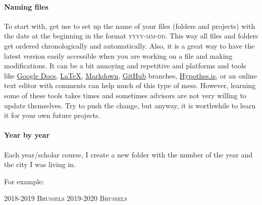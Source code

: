 \documentclass{article}
\begin{document}
\paragraph{Naming files}
\label{parag: naming}

To start with, get use to set up the name of your files (folders and projects) with the date at the beginning in the format \textsc{yyyy-mm-dd}. This way all files and folders get ordered chronologically and automatically. Also, it is a great way to have the latest version easily accessible when you are working on a file and making modifications. It can be a bit annoying and repetitive and platforms and tools like \href{https://www.google.com/docs/about/}{Google Docs}, \href{https://www.latex-project.org/}{\LaTeX}, \href{https://en.wikipedia.org/wiki/Markdown}{Markdown}, \href{https://github.com/}{GitHub} branches, \href{https://web.hypothes.is/}{Hypothes.is}, or an online text editor with comments can help much of this type of mess. However, learning some of these tools takes times and sometimes advisors are not very willing to update themselves. Try to push the change, but anyway, it is worthwhile to learn it for your own future projects. 

\paragraph{Year by year}
\label{parag: year}

Each year/scholar course, I create a new folder with the number of the year and the city I was living in. 

For example: 
\begin{center}
\textsc{2018-2019 Brussels}
\textsc{2019-2020 Brussels}
\end{center}
\end{document}
